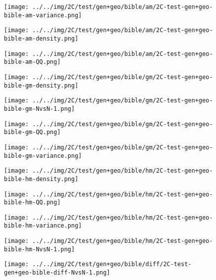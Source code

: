 \begin{figure}[H]
\centering	\texttt{[image: ../../img/2C/test/gen+geo/bible/am/2C-test-gen+geo-bible-am-variance.png]}
\end{figure}
\begin{figure}[H]
\centering	\texttt{[image: ../../img/2C/test/gen+geo/bible/am/2C-test-gen+geo-bible-am-density.png]}
\end{figure}
\begin{figure}[H]
\centering	\texttt{[image: ../../img/2C/test/gen+geo/bible/am/2C-test-gen+geo-bible-am-QQ.png]}
\end{figure}
\begin{figure}[H]
\centering	\texttt{[image: ../../img/2C/test/gen+geo/bible/gm/2C-test-gen+geo-bible-gm-density.png]}
\end{figure}
\begin{figure}[H]
\centering	\texttt{[image: ../../img/2C/test/gen+geo/bible/gm/2C-test-gen+geo-bible-gm-NvsN-1.png]}
\end{figure}
\begin{figure}[H]
\centering	\texttt{[image: ../../img/2C/test/gen+geo/bible/gm/2C-test-gen+geo-bible-gm-QQ.png]}
\end{figure}
\begin{figure}[H]
\centering	\texttt{[image: ../../img/2C/test/gen+geo/bible/gm/2C-test-gen+geo-bible-gm-variance.png]}
\end{figure}
\begin{figure}[H]
\centering	\texttt{[image: ../../img/2C/test/gen+geo/bible/hm/2C-test-gen+geo-bible-hm-density.png]}
\end{figure}
\begin{figure}[H]
\centering	\texttt{[image: ../../img/2C/test/gen+geo/bible/hm/2C-test-gen+geo-bible-hm-QQ.png]}
\end{figure}
\begin{figure}[H]
\centering	\texttt{[image: ../../img/2C/test/gen+geo/bible/hm/2C-test-gen+geo-bible-hm-variance.png]}
\end{figure}
\begin{figure}[H]
\centering	\texttt{[image: ../../img/2C/test/gen+geo/bible/hm/2C-test-gen+geo-bible-hm-NvsN-1.png]}
\end{figure}
\begin{figure}[H]
\centering	\texttt{[image: ../../img/2C/test/gen+geo/bible/diff/2C-test-gen+geo-bible-diff-NvsN-1.png]}
\end{figure}
